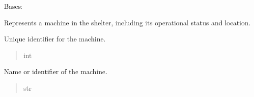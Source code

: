 \documentclass[letterpaper,10pt,english]{sphinxmanual}
\begin{document}
\begin{fulllineitems}
\label{\detokenize{app.models:app.models.machine.Machine}}
\pysigstartsignatures
\pysiglinewithargsret
{}
{\sphinxparamcomma {}\sphinxparamcomma {}\sphinxparamcomma {}\sphinxparamcomma {}\sphinxparamcomma {}\sphinxparamcomma {}\sphinxparamcomma {}}
{}
\pysigstopsignatures
\sphinxAtStartPar
Bases: 

\sphinxAtStartPar
Represents a machine in the shelter, including its operational status and location.

\begin{fulllineitems}
\label{\detokenize{app.models:app.models.machine.Machine.idMachine}}
\pysigstartsignatures
\pysigline
{}
\pysigstopsignatures
\sphinxAtStartPar
Unique identifier for the machine.
\begin{quote}\begin{description}
\sphinxAtStartPar
int

\end{description}\end{quote}

\end{fulllineitems}


\begin{fulllineitems}
\label{\detokenize{app.models:app.models.machine.Machine.machineName}}
\pysigstartsignatures
\pysigline
{}
\pysigstopsignatures
\sphinxAtStartPar
Name or identifier of the machine.
\begin{quote}\begin{description}
\sphinxAtStartPar
str


\end{description}
\end{quote}
\end{fulllineitems}
\end{fulllineitems}
\end{document}
